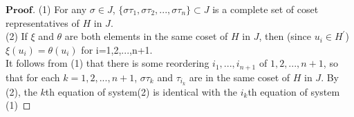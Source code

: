 \documentclass[a4paper, 11pt]{article}
\theoremstyle{remark}
\newenvironment{myprf}
{\renewcommand\qedsymbol{$ $}\begin{proof}[$\mathbf{Proof}$]}
  {\end{proof}}
\theoremstyle{definition}
\begin{document}
\begin{myprf}
            \indent (1) For any $\sigma\in J$, $\{\sigma \tau_1,\sigma \tau_2,...,\sigma\tau_n\}\subset J$ is a complete set of coset representatives of $H$ in $J$.\\
            \indent (2) If $\xi$ and $\theta$ are both elements in the same coset of $H$
            in $J$, then (since $u_i\in H^{'}$)$\xi(u_i)=\theta(u_i)$ for i=1,2,...,n+1.\\
            \indent It follows from (1) that there is some reordering $i_1,...,i_{n+1}$
            of $1,2,...,n+1$, so that for each $k=1,2,...,n+1$, $\sigma \tau_k$ and 
            $\tau_{i_k}$ are in the same coset of $H$ in $J$. By (2), the $k$th equation
            of system(2) is identical with the $i_k$th equation of system (1)
    \end{myprf}
    
\end{document}
